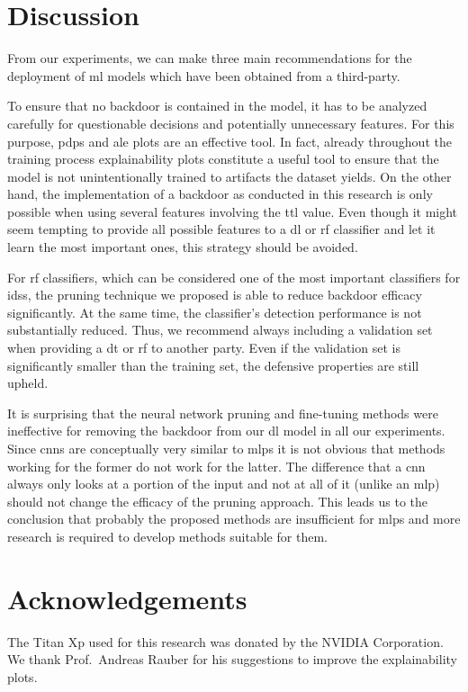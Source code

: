 \documentclass[9pt,sigconf,letterpaper,dvipsnames\ifx\removeHeaders\tempYes ,nonacm\fi]{acmart}
\begin{document}
\section{Discussion}
From our experiments, we can make three main recommendations for the deployment of \gls{ml} models which have been obtained from a third-party.

To ensure that no backdoor is contained in the model,
it has to be  analyzed carefully for questionable decisions and potentially unnecessary features. For this purpose, \glspl{pdp} and \gls{ale} plots are an effective tool. In fact, already throughout the training process explainability plots constitute a useful tool to ensure that the model is not unintentionally trained  to artifacts the dataset yields.
On the other hand, the implementation of a backdoor as conducted in this research is only possible when using several features involving the \gls{ttl} value. Even though it might seem tempting to provide all possible features to a \gls{dl} or \gls{rf} classifier and let it learn the most important ones, this strategy should be avoided.



For \gls{rf} classifiers, which can be considered one of the most important classifiers for \glspl{ids}, the pruning technique we proposed is able to reduce backdoor efficacy significantly. At the same time, the classifier's detection performance is not substantially reduced. Thus, we recommend always including a validation set when providing a \gls{dt} or \gls{rf} to another party. Even if the validation set is significantly smaller than the training set, the defensive properties are still upheld.

It is surprising that the neural network pruning and fine-tuning methods were ineffective for removing the backdoor from our \gls{dl} model in all our experiments. Since \glspl{cnn} are conceptually very similar to \glspl{mlp} it is not obvious that methods working for the former do not work for the latter. The difference that a \gls{cnn} always only looks at a portion of the input \cite{wikipedia_convolutional_2019} and not at all of it (unlike an \gls{mlp}) should not change the efficacy of the pruning approach. This leads us to the conclusion that probably the proposed methods are insufficient for \glspl{mlp} and more research is required to develop methods suitable for them.

\section*{Acknowledgements}
The Titan Xp used for this research was donated by the NVIDIA Corporation. We thank Prof.~Andreas Rauber for his suggestions to improve the explainability plots.



\end{document}

